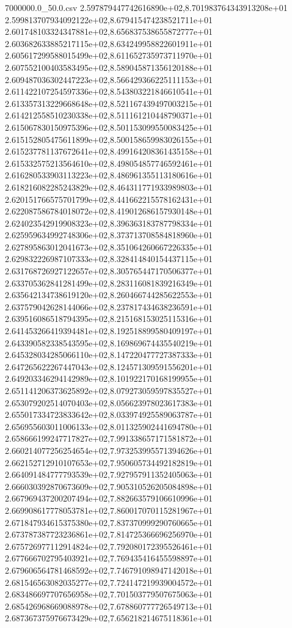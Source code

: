 \begin{filecontents*}{7000000.0_50.0.csv}
2.597879447742616890e+02,8.701983764343913208e+01
2.599813707934092122e+02,8.679415474238521711e+01
2.601748103324347881e+02,8.656837538655872777e+01
2.603682633885217115e+02,8.634249958822601911e+01
2.605617299588015499e+02,8.611652735973711970e+01
2.607552100403583495e+02,8.589045871356120188e+01
2.609487036302447223e+02,8.566429366225111153e+01
2.611422107254597336e+02,8.543803221846610541e+01
2.613357313229668648e+02,8.521167439497003215e+01
2.614212558510230338e+02,8.511161210448790371e+01
2.615067830150975396e+02,8.501153099550083425e+01
2.615152805475611899e+02,8.500158659983026155e+01
2.615237781137672641e+02,8.499164208361435158e+01
2.615332575213564610e+02,8.498054857746592461e+01
2.616280533903113223e+02,8.486961355113180616e+01
2.618216082285243829e+02,8.464311771933989803e+01
2.620151766575701799e+02,8.441662215578162431e+01
2.622087586784018072e+02,8.419012686157930148e+01
2.624023542919908323e+02,8.396363183787798334e+01
2.625959634992748306e+02,8.373713708584818960e+01
2.627895863012041673e+02,8.351064260667226335e+01
2.629832226987107333e+02,8.328414840154437115e+01
2.631768726927122657e+02,8.305765447170506377e+01
2.633705362841281499e+02,8.283116081839216349e+01
2.635642134738619120e+02,8.260466744285622553e+01
2.637579042628144066e+02,8.237817434638236591e+01
2.639516086518794395e+02,8.215168153025115316e+01
2.641453266419394481e+02,8.192518899580409197e+01
2.643390582338543595e+02,8.169869674435540219e+01
2.645328034285066110e+02,8.147220477727387333e+01
2.647265622267447043e+02,8.124571309591556201e+01
2.649203346294142989e+02,8.101922170168199955e+01
2.651141206373625892e+02,8.079273059597835527e+01
2.653079202514070403e+02,8.056623978023617383e+01
2.655017334723833642e+02,8.033974925589063787e+01
2.656955603011006133e+02,8.011325902441694780e+01
2.658666199247717827e+02,7.991338657171581872e+01
2.660214077256254654e+02,7.973253995571394626e+01
2.662152712910107653e+02,7.950605734492182819e+01
2.664091484777793539e+02,7.927957911352405063e+01
2.666030392870673609e+02,7.905310526205084898e+01
2.667969437200207494e+02,7.882663579106610996e+01
2.669908617778053781e+02,7.860017070115281967e+01
2.671847934615375380e+02,7.837370999290760665e+01
2.673787387723236861e+02,7.814725366696256970e+01
2.675726977112914824e+02,7.792080172395526461e+01
2.677666702795403921e+02,7.769435416455598897e+01
2.679606564781468592e+02,7.746791098947142018e+01
2.681546563082035277e+02,7.724147219939004572e+01
2.683486697707656958e+02,7.701503779507675063e+01
2.685426968669088978e+02,7.678860777726549713e+01
2.687367375976673429e+02,7.656218214675118361e+01

\end{filecontents*}
